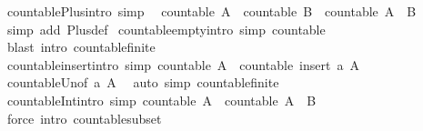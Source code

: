 \begin{isabellebody}
\endisatagproof
{\isafoldproof}%
%
\isadelimproof
\isanewline
%
\endisadelimproof
\isanewline
{}\isamarkupfalse%
\ countable{\isacharunderscore}Plus{\isacharbrackleft}intro{\isacharcomma}\ simp{\isacharbrackright}{\isacharcolon}\isanewline
\ \ {\isachardoublequoteopen}countable\ A\ {\isasymLongrightarrow}\ countable\ B\ {\isasymLongrightarrow}\ countable\ {\isacharparenleft}A\ {\isacharless}{\isacharplus}{\isachargreater}\ B{\isacharparenright}{\isachardoublequoteclose}\isanewline
%
\isadelimproof
\ \ %
\endisadelimproof
%
\isatagproof
{}\isamarkupfalse%
\ {\isacharparenleft}simp\ add{\isacharcolon}\ Plus{\isacharunderscore}def{\isacharparenright}%
\endisatagproof
{\isafoldproof}%
%
\isadelimproof
\isanewline
%
\endisadelimproof
\isanewline
{}\isamarkupfalse%
\ countable{\isacharunderscore}empty{\isacharbrackleft}intro{\isacharcomma}\ simp{\isacharbrackright}{\isacharcolon}\ {\isachardoublequoteopen}countable\ {\isacharbraceleft}{\isacharbraceright}{\isachardoublequoteclose}\isanewline
%
\isadelimproof
\ \ %
\endisadelimproof
%
\isatagproof
{}\isamarkupfalse%
\ {\isacharparenleft}blast\ intro{\isacharcolon}\ countable{\isacharunderscore}finite{\isacharparenright}%
\endisatagproof
{\isafoldproof}%
%
\isadelimproof
\isanewline
%
\endisadelimproof
\isanewline
{}\isamarkupfalse%
\ countable{\isacharunderscore}insert{\isacharbrackleft}intro{\isacharcomma}\ simp{\isacharbrackright}{\isacharcolon}\ {\isachardoublequoteopen}countable\ A\ {\isasymLongrightarrow}\ countable\ {\isacharparenleft}insert\ a\ A{\isacharparenright}{\isachardoublequoteclose}\isanewline
%
\isadelimproof
\ \ %
\endisadelimproof
%
\isatagproof
{}\isamarkupfalse%
\ countable{\isacharunderscore}Un{\isacharbrackleft}of\ {\isachardoublequoteopen}{\isacharbraceleft}a{\isacharbraceright}{\isachardoublequoteclose}\ A{\isacharbrackright}\ \isamarkupfalse%
\ {\isacharparenleft}auto\ simp{\isacharcolon}\ countable{\isacharunderscore}finite{\isacharparenright}%
\endisatagproof
{\isafoldproof}%
%
\isadelimproof
\isanewline
%
\endisadelimproof
\isanewline
{}\isamarkupfalse%
\ countable{\isacharunderscore}Int{}{\isacharbrackleft}intro{\isacharcomma}\ simp{\isacharbrackright}{\isacharcolon}\ {\isachardoublequoteopen}countable\ A\ {\isasymLongrightarrow}\ countable\ {\isacharparenleft}A\ {\isasyminter}\ B{\isacharparenright}{\isachardoublequoteclose}\isanewline
%
\isadelimproof
\ \ %
\endisadelimproof
%
\isatagproof
{}\isamarkupfalse%
\ {\isacharparenleft}force\ intro{\isacharcolon}\ countable{\isacharunderscore}subset{\isacharparenright}%

\end{isabellebody}
